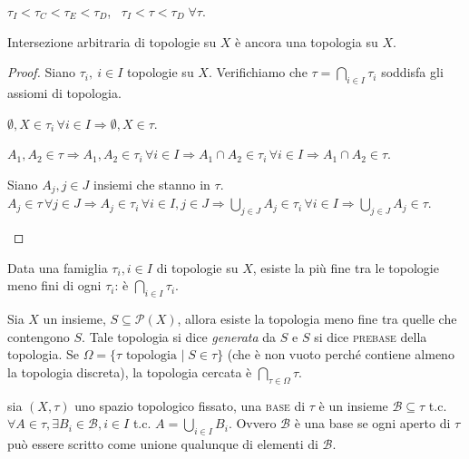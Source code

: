 \documentclass{article}
\begin{document}
\begin{ex}
	$\tau_I < \tau_C < \tau_E < \tau_D$, \, $\tau_I < \tau < \tau_D \; \forall
	\tau$.
\end{ex}

\begin{lm}
	Intersezione arbitraria di topologie su $X$ è ancora una topologia su $X$.
\end{lm}

\begin{proof}
    Siano $\tau_i,\ i \in I$ topologie su $X$. Verifichiamo che $
    \tau=\bigcap_{i \in I} \tau_i$ soddisfa gli assiomi di topologia.

    \begin{nlist}
        \item $\emptyset, X \in \tau_i \, \forall i \in I \Rightarrow \emptyset,
        X \in \tau$.

        \item $A_1, A_2 \in \tau \Rightarrow A_1, A_2 \in \tau_i \, \forall i
        \in I \Rightarrow A_1 \cap A_2 \in \tau_i \, \forall i \in I \Rightarrow
        A_1 \cap A_2 \in \tau$.

        \item Siano $A_j, j \in J$ insiemi che stanno in $\tau$. \\
        $\displaystyle A_j \in \tau \, \forall j \in J \Rightarrow A_j \in
        \tau_i \, \forall i \in I, j \in J \Rightarrow {\bigcup_{j \in J} A_j
        \in \tau_i \, \forall i \in I} \Rightarrow {\bigcup_{j \in J} A_j \in
        \tau}$.
    \end{nlist}
\end{proof}

\begin{cor}
	Data una famiglia $\tau_i, i \in I$ di topologie su $X$, esiste la più fine
	tra le topologie meno fini di ogni $\tau_i$: è $\displaystyle \bigcap_{i \in
	I} \tau_i$.
\end{cor}

\begin{cor}
	Sia $X$ un insieme, $S \subseteq \mathcal{P}(X)$, allora esiste la topologia
	meno fine tra quelle che contengono $S$. Tale topologia si dice
	\textit{generata} da $S$ e $S$ si dice \textsc{prebase} della topologia. Se
	$\Omega= \{ \tau \text{ topologia } |\; S \in \tau \}$ (che è non vuoto
	perché contiene almeno la topologia discreta), la topologia cercata è
	$\displaystyle \bigcap_{\tau \in \Omega} \tau$.
\end{cor}

\begin{defn}
	sia $(X, \tau)$ uno spazio topologico fissato, una \textsc{base} di $\tau$ è
	un insieme $\mathcal{B} \subseteq \tau$ t.c. $\forall A \in \tau, \exists
	B_i \in \mathcal{B}, i \in I$ t.c. $A= \bigcup_{i \in I} B_i$. Ovvero
	$\mathcal{B}$ \`e una base se ogni aperto di $\tau$ pu\`o essere scritto
	come unione qualunque di elementi di $\mathcal{B}$.
\end{defn}
\end{document}
